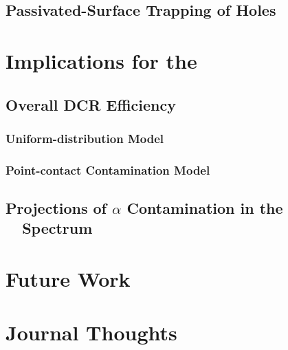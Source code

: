 \documentclass[groupedaddress,rmp,amsmath,amssymb,bibnotes,altaffilletter,twocolumn]{revtex4-1}
\begin{document}
\subsection{Passivated-Surface Trapping of Holes}

\section{Implications for the \MJ\ \DEM\ }
\subsection{Overall DCR Efficiency}
\subsubsection{Uniform-distribution Model}
\subsubsection{Point-contact Contamination Model}

\subsection{Projections of $\alpha$ Contamination in the \MJ\ \DEM\ Spectrum}

\section{Future Work}



\section{Journal Thoughts}





\end{document}
